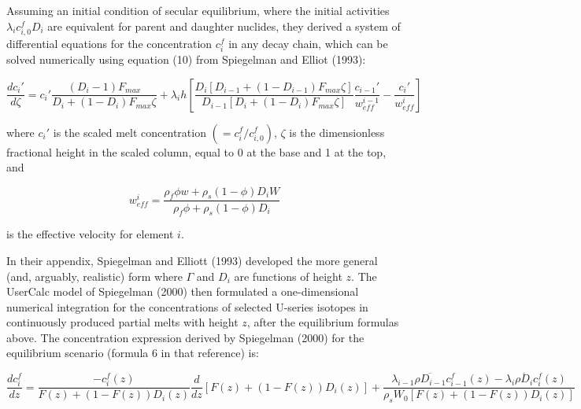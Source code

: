 \documentclass[draft]{agujournal2019}
\begin{document}
Assuming an initial condition of secular equilibrium, where the initial activities $\lambda_i c_{i,0}^f D_i$ are equivalent for parent and daughter nuclides, they derived a system of differential equations for the concentration $c_i^f$ in any decay chain, which can be solved numerically using equation (10) from Spiegelman and Elliot (1993):

\begin{linenomath*}
\begin{equation}
    \frac{dc_i'}{d\zeta} = c_i' \frac{(D_i-1)F_{max}}{D_i + (1-D_i)F_{max} \zeta} + \lambda_i h\left[ \frac{D_i[D_{i-1}+(1-D_{i-1})F_{max}\zeta]}{D_{i-1}[D_i + (1-D_i)F_{max}\zeta]} \frac{c_{i-1}'}{w_{eff}^{i-1}} - \frac{c_i'}{w_{eff}^i}\right]\label{eq:4}
\end{equation}
\end{linenomath*}

where $c_i'$ is the scaled melt concentration $(= c_i^f/c_{i,0}^f)$, $\zeta$ is the dimensionless fractional height in the scaled column, equal to 0 at the base and 1 at the top, and

\begin{linenomath*}
\begin{equation}
    w_{eff}^i = \frac{\rho_f \phi w + \rho_s(1-\phi)D_i W}{\rho_f \phi + \rho_s(1-\phi)D_i}\label{eq:5}
\end{equation}
\end{linenomath*}

is the effective velocity for element $i$.

In their appendix, Spiegelman and Elliott (1993) developed the more general (and, arguably, realistic) form where $\Gamma$ and $D_i$ are functions of height $z$. The UserCalc model of Spiegelman (2000) then formulated a one-dimensional numerical integration for the concentrations of selected U-series isotopes in continuously produced partial melts with height $z$, after the equilibrium formulas above. The concentration expression derived by Spiegelman (2000) for the equilibrium scenario (formula 6 in that reference) is:

\begin{linenomath*}
\begin{equation}
    \frac{dc_i^f}{dz} = \frac{-c_i^f(z)}{F(z) + (1 - F(z)) D_i(z)} \frac{d}{dz} [F(z) + (1 - F(z)) D_i(z)] + \frac{\lambda_{i-1}\overline{\rho D_{i-1}} c_{i-1}^f(z) - \lambda_{i}\overline{\rho D_{i}} c_{i}^f(z)}{\rho_s W_0 [F(z) + (1 - F(z)) D_i(z)]}\label{eq:6}
\end{equation}
\end{linenomath*}
\end{document}
